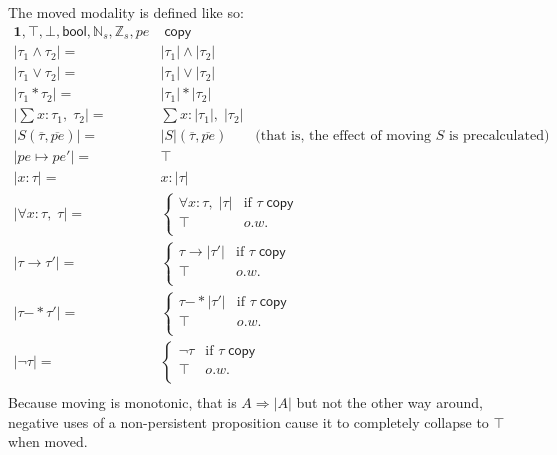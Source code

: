 \documentclass[acmsmall,nonacm]{acmart}
\newcommand*{\N}{\mathbb{N}}
\newcommand*{\Z}{\mathbb{Z}}
\newcommand{\wand}{\mathrel{-\!\!\ast}}
\newcommand{\core}[1]{\left| #1 \right|}
\begin{document}
The moved modality is defined like so:
\begin{align*}
  \mathbf{1},\top,\bot,\mathsf{bool},\N_s, \Z_s,pe&\;\mathsf{copy}\\
  \core{\tau_1\land \tau_2}={}&\core{\tau_1}\land \core{\tau_2}\\
  \core{\tau_1\lor \tau_2}={}&\core{\tau_1}\lor \core{\tau_2}\\
  \core{\tau_1\ast \tau_2}={}&\core{\tau_1}\ast \core{\tau_2}\\
  \core{\textstyle\sum x:\tau_1,\;\tau_2}={}&\textstyle\sum x:\core{\tau_1},\;\core {\tau_2}\\
  \core{S(\overline{\tau},\overline{pe})}={}&\core{S}(\overline{\tau},\overline{pe})\qquad\mbox{(that is, the effect of moving $S$ is precalculated)}\\
  \core{pe\mapsto pe'}={}&\top\\
  \core{\boxed{x:\tau}}={}&\boxed{x:\core{\tau}}\\
  \core{\forall x:\tau,\;\tau}={}& \begin{cases}
    \forall x:\tau,\;\core \tau&\mbox{if $\tau\;\mathsf{copy}$}\\
    \top&o.w.\\
  \end{cases}\\
  \core{\tau\to \tau'}={}& \begin{cases}
    \tau\to \core{\tau'}&\mbox{if $\tau\;\mathsf{copy}$}\\
    \top&o.w.\\
  \end{cases}\\
  \core{\tau\wand \tau'}={}& \begin{cases}
    \tau\wand \core{\tau'}&\mbox{if $\tau\;\mathsf{copy}$}\\
    \top&o.w.\\
  \end{cases}\\
  \core{\neg \tau}={}& \begin{cases}
    \neg \tau&\mbox{if $\tau\;\mathsf{copy}$}\\
    \top&o.w.\\
  \end{cases}\\
\end{align*}
Because moving is monotonic, that is $A\Rightarrow \core A$ but not the other way around, negative uses of a non-persistent proposition cause it to completely collapse to $\top$ when moved.
\end{document}
